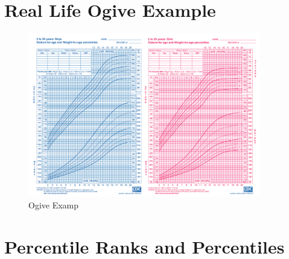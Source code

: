 \documentclass[12pt]{article}
\begin{document}
\section{Real Life Ogive Example}\label{real-life-ogive-example}

\begin{figure}[H]
\centering
\includegraphics[width=4in]{Ogive_Examp.png}
\caption{Ogive Examp}
\end{figure}

\section{Percentile Ranks and
Percentiles}\label{percentile-ranks-and-percentiles}
\end{document}
